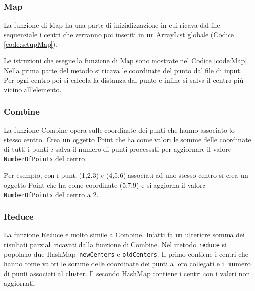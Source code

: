 \documentclass[10pt,twocolumn,letterpaper]{article}
\newcommand{\code}[1]{\texttt{#1}}
\begin{document}
    \subsubsection{Map}
        La funzione di Map ha una parte di inizializzazione in cui ricava dal
        file sequenziale i centri che verranno poi inseriti in un ArrayList
        globale (Codice \ref{code:setupMap}).
        

        Le istruzioni che esegue la funzione di Map sono mostrate nel
        Codice \ref{code:Map}. Nella prima parte del metodo si ricava le
        coordinate del punto dal file di input. Per ogni centro poi si calcola la
        distanza dal punto e infine si salva il centro più vicino all'elemento.
        
    \subsubsection{Combine}
        La funzione Combine opera sulle coordinate dei punti che hanno associato lo
        stesso centro. Crea un oggetto Point che ha come valori le
        somme delle coordinate di tutti i punti e salva il numero di punti
        processati per aggiornare il valore \code{NumberOfPoints} del centro.

        Per esempio, con i punti (1,2,3) e (4,5,6) associati
        ad uno stesso centro si crea un oggetto Point che ha come coordinate
        (5,7,9) e si aggiorna il valore \code{NumberOfPoints} del centro a 2.

        
    \subsubsection{Reduce}
        La funzione Reduce è molto simile a Combine. Infatti fa un ulteriore
        somma dei risultati parziali ricavati dalla funzione di Combine.
        Nel metodo \code{reduce} si popolano due HashMap: \code{newCenters} e \code{oldCenters}.
        Il primo contiene i centri che hanno come valori le somme delle coordinate
        dei punti a loro collegati e il numero di punti associati al cluster.
        Il secondo HashMap contiene i centri con i valori non aggiornati.
        
\end{document}
